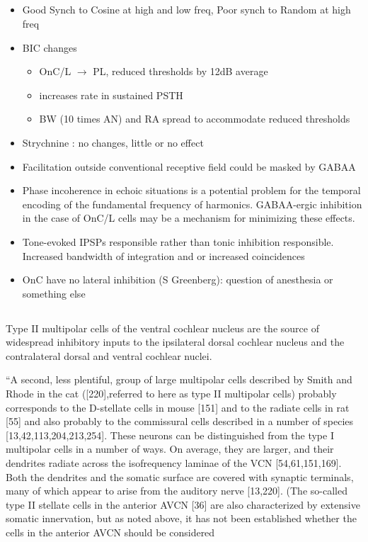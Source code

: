 \documentclass[10pt,a4paper]{article}
\begin{document}
\subsection{\citep{EvansZhao:1993}}


\begin{itemize}
\item Good Synch to Cosine at high and low freq, Poor synch to Random at high
  freq
\item BIC changes

  \begin{itemize}
  \item OnC/L \ensuremath{\rightarrow} PL, reduced thresholds by 12dB average
  \item increases rate in sustained PSTH
  \item BW (10 times AN) and RA spread to accommodate reduced thresholds
  \end{itemize}
\item Strychnine : no changes, little or no effect
\item Facilitation outside conventional receptive field could be masked by GABAA
  \citep{JiangPalmerEtAl:1996,WinterPalmer:1995}
\item Phase incoherence in echoic situations is a potential problem for the
  temporal encoding of the fundamental frequency of harmonics.  GABAA{}-ergic
  inhibition in the case of OnC/L cells may be a mechanism for minimizing these
  effects.
\item Tone-evoked IPSPs responsible rather than tonic inhibition
  responsible. Increased bandwidth of integration and or increased coincidences
\item OnC have no lateral inhibition (S Greenberg): question of anesthesia or
  something else
\end{itemize}

\subsection{\citep{CantBenson:2003}}
Type II multipolar cells of the ventral cochlear nucleus
are the source of widespread inhibitory inputs to the ipsilateral dorsal
cochlear nucleus and the contralateral dorsal and ventral cochlear nuclei.

{\textquotedblleft}A second, less plentiful, group of large multipolar cells
described by Smith and Rhode in the cat ([220],referred to here as type II
multipolar cells) probably corresponds to the D-stellate cells in mouse [151]
and to the radiate cells in rat [55] and also probably to the commissural cells
described in a number of species [13,42,113,204,213,254]. These neurons can be
distinguished from the type I multipolar cells in a number of ways. On average,
they are larger, and their dendrites radiate across the isofrequency laminae of
the VCN [54,61,151,169]. Both the dendrites and the somatic surface are covered
with synaptic terminals, many of which appear to arise from the auditory nerve
[13,220]. (The so-called type II stellate cells in the anterior AVCN [36] are
also characterized by extensive somatic innervation, but as noted above, it has
not been established whether the cells in the anterior AVCN should be considered
\end{document}
